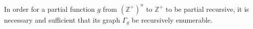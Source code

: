 In order for a partial function $g$ from $(\mathbb{Z}^+)^n$ to $\mathbb{Z}^+$ to be partial recursive, it is necessary and sufficient that its graph $\Gamma_g$ be recursively enumerable.